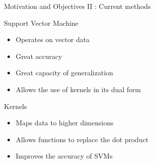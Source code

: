 \documentclass[compress]{beamer}
\begin{document}
\begin{frame}{Motivation and Objectives II : Current methods}
	\begin{block}{Support Vector Machine \citep{cortes_support-vector_1995}}
		\begin{itemize}
			\item Operates on vector data
			\item Great accuracy
			\item Great capacity of generalization
			\item Allows the use of kernels in its dual form
		\end{itemize}
	\end{block}
	\begin{block}{Kernels}
		\begin{itemize}
			\item Maps data to higher dimensions
			\item Allows functions to replace the dot product
			\item Improves the accuracy of SVMs
		\end{itemize}
	\end{block}
\end{frame}
\end{document}
